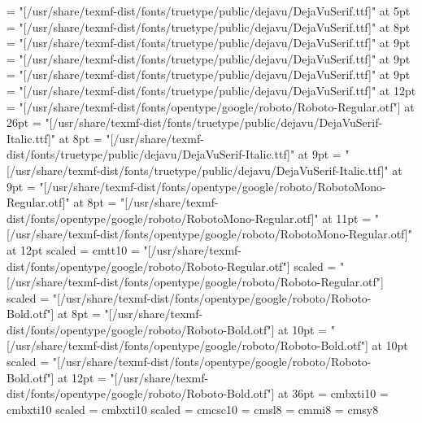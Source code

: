 

%
%

%
\font\fiverm = "[/usr/share/texmf-dist/fonts/truetype/public/dejavu/DejaVuSerif.ttf]" at 5pt
\font\eightrm = "[/usr/share/texmf-dist/fonts/truetype/public/dejavu/DejaVuSerif.ttf]" at 8pt
\font\ninerm = "[/usr/share/texmf-dist/fonts/truetype/public/dejavu/DejaVuSerif.ttf]" at 9pt %
\font\tenrm = "[/usr/share/texmf-dist/fonts/truetype/public/dejavu/DejaVuSerif.ttf]" at 9pt %
\font\oldtenrm = "[/usr/share/texmf-dist/fonts/truetype/public/dejavu/DejaVuSerif.ttf]" at 9pt %
\font\twelverm  = "[/usr/share/texmf-dist/fonts/truetype/public/dejavu/DejaVuSerif.ttf]" at 12pt
\font\twentysixrm = "[/usr/share/texmf-dist/fonts/opentype/google/roboto/Roboto-Regular.otf"] at 26pt
%
\font\eightit = "[/usr/share/texmf-dist/fonts/truetype/public/dejavu/DejaVuSerif-Italic.ttf]" at 8pt
\font\nineit = "[/usr/share/texmf-dist/fonts/truetype/public/dejavu/DejaVuSerif-Italic.ttf]" at 9pt
\font\tenit = "[/usr/share/texmf-dist/fonts/truetype/public/dejavu/DejaVuSerif-Italic.ttf]" at 9pt
%
\font\eighttt = "[/usr/share/texmf-dist/fonts/opentype/google/roboto/RobotoMono-Regular.otf]" at 8pt
\font\eleventt = "[/usr/share/texmf-dist/fonts/opentype/google/roboto/RobotoMono-Regular.otf]" at 11pt
\font\twelvett = "[/usr/share/texmf-dist/fonts/opentype/google/roboto/RobotoMono-Regular.otf]" at 12pt scaled 
%
\font\tenbt = cmtt10
%
\font\elevensf = "[/usr/share/texmf-dist/fonts/opentype/google/roboto/Roboto-Regular.otf"] scaled\magstephalf
\font\fourteensf = "[/usr/share/texmf-dist/fonts/opentype/google/roboto/Roboto-Regular.otf"] scaled
%
\font\eightbf = "[/usr/share/texmf-dist/fonts/opentype/google/roboto/Roboto-Bold.otf"] at 8pt
\font\tenbf = "[/usr/share/texmf-dist/fonts/opentype/google/roboto/Roboto-Bold.otf"] at 10pt
\font\elevenbf = "[/usr/share/texmf-dist/fonts/opentype/google/roboto/Roboto-Bold.otf"] at 10pt scaled \magstephalf
\font\twelvebf = "[/usr/share/texmf-dist/fonts/opentype/google/roboto/Roboto-Bold.otf"] at 12pt
\font\thirtysixbf = "[/usr/share/texmf-dist/fonts/opentype/google/roboto/Roboto-Bold.otf"] at 36pt
%
\font\tenbi = cmbxti10
\font\elevenbi= cmbxti10 scaled \magstephalf
\font\fourteenbi= cmbxti10 scaled 
%
\font\tensc = cmcsc10
\font\eightsl = cmsl8
\font\eighti = cmmi8
\font\eightsy = cmsy8

